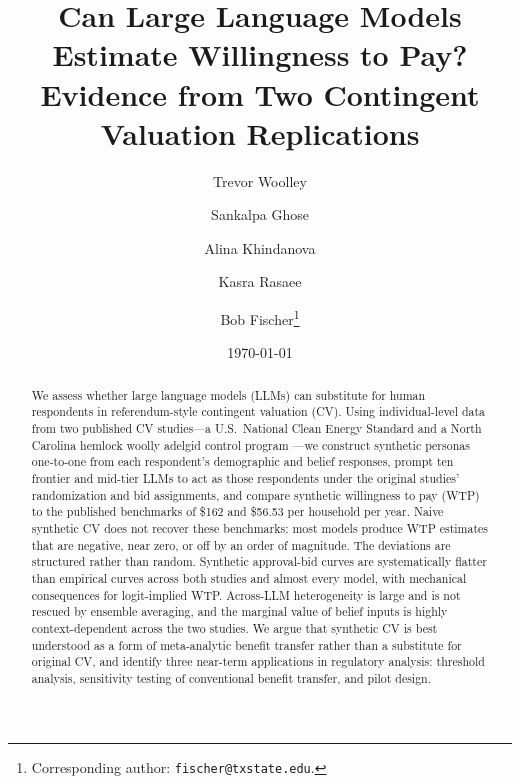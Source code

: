 \documentclass[12pt]{article}
\title{Can Large Language Models Estimate Willingness to Pay? \\ Evidence from Two Contingent Valuation Replications}
\date{\today}
\author[1]{Trevor Woolley}
\author[2]{Sankalpa Ghose}
\author[3]{Alina Khindanova}
\author[4]{Kasra Rasaee}
\author[5]{Bob Fischer\thanks{Corresponding author: \texttt{fischer@txstate.edu}.}}
\affil[1]{\textit{University of California, Berkeley}}
\affil[2]{\textit{National University of Singapore}}
\affil[3]{\textit{University of Texas at San Antonio}}
\affil[4]{\textit{Bloomberg}}
\affil[5]{\textit{Texas State University}}
\begin{document}

\maketitle


\footnotesize
\begin{abstract}
We assess whether large language models (LLMs) can substitute for human
respondents in referendum-style contingent valuation (CV). Using
individual-level data from two published CV studies---a U.S.\ National
Clean Energy Standard \parencite{Aldy2012} and a North Carolina hemlock
woolly adelgid control program \parencite{Giguere2020}---we construct
synthetic personas one-to-one from each respondent's demographic and
belief responses, prompt ten frontier and mid-tier LLMs to act as those
respondents under the original studies' randomization and bid
assignments, and compare synthetic willingness to pay (WTP) to the
published benchmarks of \$162 and \$56.53 per household per year. Naive
synthetic CV does not recover these benchmarks: most models produce WTP
estimates that are negative, near zero, or off by an order of magnitude.
The deviations are structured rather than random. Synthetic approval-bid
curves are systematically flatter than empirical curves across both
studies and almost every model, with mechanical consequences for
logit-implied WTP. Across-LLM heterogeneity is large and is not rescued
by ensemble averaging, and the marginal value of belief inputs is
highly context-dependent across the two studies. We argue that synthetic
CV is best understood as a form of meta-analytic benefit transfer rather
than a substitute for original CV, and identify three near-term
applications in regulatory analysis: threshold analysis, sensitivity
testing of conventional benefit transfer, and pilot design.
\end{abstract}

\newpage

%
\end{document}
